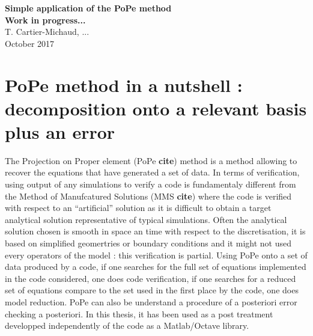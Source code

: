 \documentclass[12pt,a4paper]{paper}
\begin{document}
\begin{center}
  {\bf \Large Simple application of the PoPe method\\ Work in progress... \vspace{2.pt}\\}
  {T. Cartier-Michaud, ...} \\
  {October 2017}\\
\end{center}

\tableofcontents

\section[PoPe method in a nutshell]{PoPe method in a nutshell : decomposition onto a relevant basis plus an error}
The Projection on Proper element (PoPe \textbf{cite}) method is a method allowing to recover the equations that have generated a set of data. In terms of verification, using output of any simulations to verify a code is fundamentaly different from the Method of Manufcatured Solutions (MMS \textbf{cite}) where the code is verified with respect to an ``artificial'' solution as it is difficult to obtain a target analytical solution representative of typical simulations. Often the analytical solution chosen is smooth in space an time with respect to the discretisation, it is based on simplified geomertries or boundary conditions and it might not used every operators of the model : this verification is partial.
Using PoPe onto a set of data produced by a code, if one searches for the full set of equations implemented in the code considered, one does code verification, if one searches for a reduced set of equations compare to the set used in the first place by the code, one does model reduction.
PoPe can also be understand a procedure of a posteriori error checking a posteriori. In this thesis, it has been used as a post treatment developped independently of the code as a Matlab/Octave library.
\end{document}
